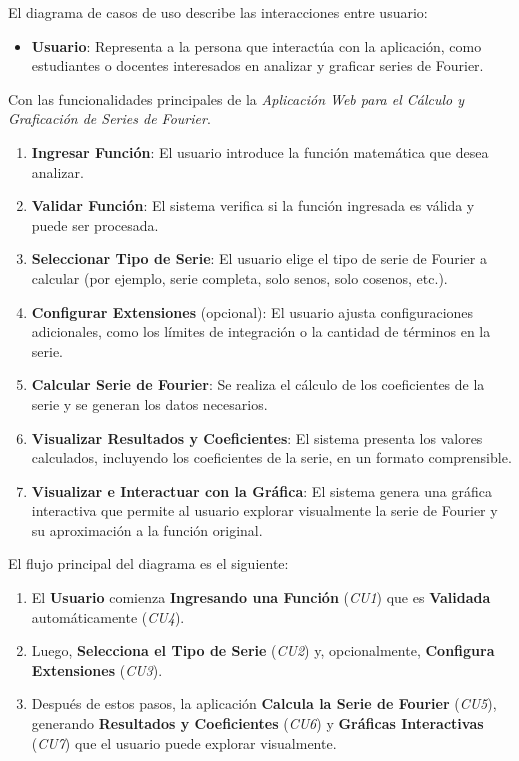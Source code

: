 El diagrama de casos de uso describe las interacciones entre usuario: 
\begin{itemize}
	\item \textbf{Usuario}: Representa a la persona que interactúa con la aplicación, como estudiantes o docentes interesados en analizar y graficar series de Fourier.
\end{itemize}
Con las funcionalidades principales de la \textit{Aplicación Web para el Cálculo y Graficación de Series de Fourier}. 
\begin{enumerate}
	\item \textbf{Ingresar Función}: El usuario introduce la función matemática que desea analizar.
	\item \textbf{Validar Función}: El sistema verifica si la función ingresada es válida y puede ser procesada.
	\item \textbf{Seleccionar Tipo de Serie}: El usuario elige el tipo de serie de Fourier a calcular (por ejemplo, serie completa, solo senos, solo cosenos, etc.).
	\item \textbf{Configurar Extensiones} (opcional): El usuario ajusta configuraciones adicionales, como los límites de integración o la cantidad de términos en la serie.
	\item \textbf{Calcular Serie de Fourier}: Se realiza el cálculo de los coeficientes de la serie y se generan los datos necesarios.
	\item \textbf{Visualizar Resultados y Coeficientes}: El sistema presenta los valores calculados, incluyendo los coeficientes de la serie, en un formato comprensible.
	\item \textbf{Visualizar e Interactuar con la Gráfica}: El sistema genera una gráfica interactiva que permite al usuario explorar visualmente la serie de Fourier y su aproximación a la función original.
\end{enumerate}
El flujo principal del diagrama es el siguiente:
\begin{enumerate}
	\item El \textbf{Usuario} comienza \textbf{Ingresando una Función} (\textit{CU1}) que es \textbf{Validada} automáticamente (\textit{CU4}).
	\item Luego, \textbf{Selecciona el Tipo de Serie} (\textit{CU2}) y, opcionalmente, \textbf{Configura Extensiones} (\textit{CU3}).
	\item Después de estos pasos, la aplicación \textbf{Calcula la Serie de Fourier} (\textit{CU5}), generando \textbf{Resultados y Coeficientes} (\textit{CU6}) y \textbf{Gráficas Interactivas} (\textit{CU7}) que el usuario puede explorar visualmente.
\end{enumerate}

